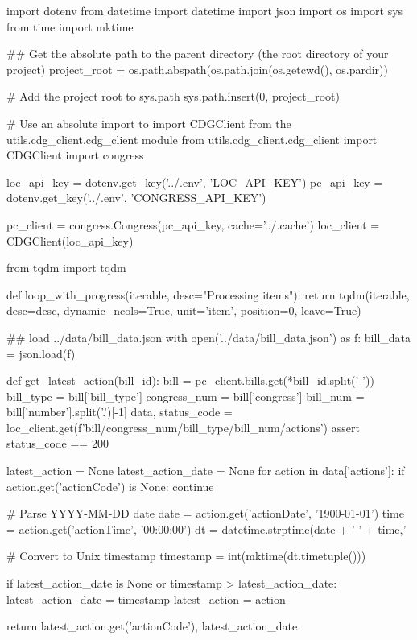 

\begin{pyin}
import dotenv
from datetime import datetime
import json
import os
import sys
from time import mktime
\end{pyin}

\begin{pyin}
\## Get the absolute path to the parent directory (the root directory of your project)
project_root = os.path.abspath(os.path.join(os.getcwd(), os.pardir))

# Add the project root to sys.path
sys.path.insert(0, project_root)

# Use an absolute import to import CDGClient from the utils.cdg_client.cdg_client module
from utils.cdg_client.cdg_client import CDGClient
import congress


loc_api_key = dotenv.get_key('../.env', 'LOC_API_KEY')
pc_api_key = dotenv.get_key('../.env', 'CONGRESS_API_KEY')

pc_client = congress.Congress(pc_api_key, cache='../.cache')
loc_client = CDGClient(loc_api_key)
\end{pyin}

\begin{pyin}
from tqdm import tqdm

def loop_with_progress(iterable, desc="Processing items"):
    return tqdm(iterable, desc=desc, dynamic_ncols=True, unit='item', position=0, leave=True)
\end{pyin}

\begin{pyin}
\## load ../data/bill_data.json
with open('../data/bill_data.json') as f:
    bill_data = json.load(f)
\end{pyin}

\begin{pyin}
def get_latest_action(bill_id):
    bill = pc_client.bills.get(*bill_id.split('-'))
    bill_type = bill['bill_type']
    congress_num = bill['congress']
    bill_num = bill['number'].split('.')[-1]
    data, status_code = loc_client.get(f'bill/{congress_num}/{bill_type}/{bill_num}/actions')
    assert status_code == 200

    latest_action = None
    latest_action_date = None
    for action in data['actions']:
        if action.get('actionCode') is None:
            continue

        # Parse YYYY-MM-DD date
        date = action.get('actionDate', '1900-01-01')
        time = action.get('actionTime', '00:00:00')
        dt = datetime.strptime(date + ' ' + time,'%

        # Convert to Unix timestamp
        timestamp = int(mktime(dt.timetuple()))

        if latest_action_date is None or timestamp > latest_action_date:
            latest_action_date = timestamp
            latest_action = action

    return latest_action.get('actionCode'), latest_action_date
\end{pyin}

